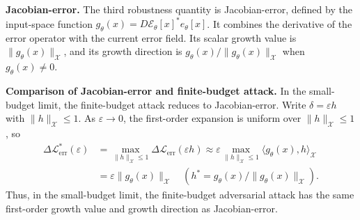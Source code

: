 ﻿\documentclass[letterpaper]{article} %
\begin{document}
\smallskip
\noindent\textbf{Jacobian-error.}
The third robustness quantity is Jacobian-error, defined by the
input-space function
$g_\theta(x)=D\mathcal{E}_\theta[x]^*e_\theta[x]$. It combines the derivative
of the error operator with the current error field. Its scalar growth value is
$\|g_\theta(x)\|_{\mathcal{X}}$, and its growth direction is
$g_\theta(x)/\|g_\theta(x)\|_{\mathcal{X}}$ when $g_\theta(x)\neq0$.

\smallskip
\noindent\textbf{Comparison of Jacobian-error and finite-budget attack.}
In the small-budget limit, the finite-budget attack reduces to
Jacobian-error. Write
$\delta=\varepsilon h$ with $\|h\|_{\mathcal{X}}\le 1$. As
$\varepsilon\to0$, the first-order expansion is uniform over
$\|h\|_{\mathcal{X}}\le1$, so
\begin{align*}
  \Delta\mathcal{L}_{\mathrm{err}}^*(\varepsilon)
  &=
  \max_{\|h\|_{\mathcal{X}}\le1}
  \Delta\mathcal{L}_{\mathrm{err}}(\varepsilon h)
  \approx
  \varepsilon\max_{\|h\|_{\mathcal{X}}\le 1}
  \langle g_\theta(x),h\rangle_{\mathcal{X}}
  \\
  &=
  \varepsilon\|g_\theta(x)\|_{\mathcal{X}}
  \quad
  \left(
  h^*=g_\theta(x)/\|g_\theta(x)\|_{\mathcal{X}}
  \right).
\end{align*}
Thus, in the small-budget limit, the finite-budget adversarial attack has the
same first-order growth value and growth direction as Jacobian-error.
\end{document}
